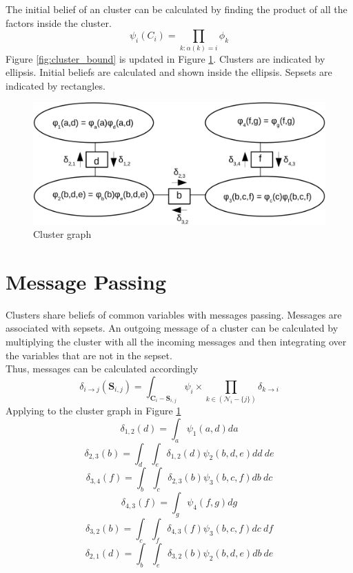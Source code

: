 \documentclass[12pt,oneside,openany,a4paper, %
afrikaans,english,
]{memoir}
\numberwithin{equation}{chapter}
\begin{document}
The initial belief of an cluster can be calculated by finding the product of all the factors inside the cluster.~\citep{koller}
\begin{equation}
\psi_i(C_i) = \prod_{k:\alpha (k) = i}\phi_k
\end{equation}
Figure \ref{fig:cluster_bound} is updated in Figure \ref{fig:clustergraph}. Clusters are indicated by ellipsis. Initial beliefs are calculated and shown inside the ellipsis. Sepsets are indicated by rectangles.\\
\begin{figure}[H]
  \includegraphics[width=\linewidth]{Figures/clustergraph.png}
  \centering
  \caption{Cluster graph}
  \label{fig:clustergraph}
\end{figure}
\section{Message Passing}
Clusters share beliefs of common variables with messages passing. Messages are associated with sepsets. An outgoing message of a cluster can be calculated by multiplying the cluster with all the incoming messages and then integrating over the variables that are not in the sepset.
\\Thus, messages can be calculated accordingly~\citep{koller}
\begin{equation}
\delta_{i\to j}(\bm{S}_{i,j}) = \int_{\bm{C}_i - \bm{S}_{i,j}}\psi_i \times \prod_{k\in(\mathcal{N}_i - \{j\})} \delta_{k\to i}
\end{equation}
Applying to the cluster graph in Figure \ref{fig:clustergraph}
\begin{equation}\label{eq:del12}
\delta_{1,2}(d) = \int_a \psi_1(a,d)da
\end{equation}
\begin{equation}
\delta_{2,3}(b) = \int_d \int_e \delta_{1,2}(d)\psi_2(b,d,e)dd\ de
\end{equation}
\begin{equation}
\delta_{3,4}(f) = \int_b \int_c \delta_{2,3}(b)\psi_3(b,c,f)db\ dc
\end{equation}
\begin{equation}
\delta_{4,3}(f) = \int_g \psi_4(f,g)dg
\end{equation}
\begin{equation}
\delta_{3,2}(b) = \int_c \int_f \delta_{4,3}(f)\psi_3(b,c,f)dc\ df
\end{equation}
\begin{equation}
\delta_{2,1}(d) = \int_b \int_e \delta_{3,2}(b)\psi_2(b,d,e)db\ de
\end{equation}
\end{document}
